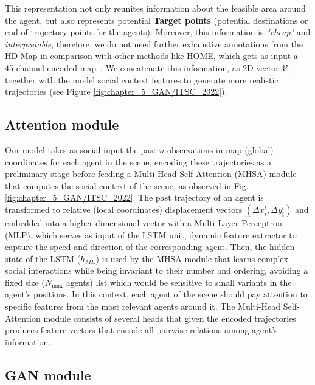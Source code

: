 This representation not only reunites information about the feasible area around the agent, but also represents potential \textbf{Target points} \cite{dendorfer2020goal} (\ie potential destinations or end-of-trajectory points for the agents). Moreover, this information is \textit{"cheap"} and \textit{interpretable}, therefore, we do not need further exhaustive annotations from the HD Map in comparison with other methods like HOME, which gets as input a 45-channel encoded map~\cite{gilles2021home}.
%
We concatenate this information, as 2D vector $\mathcal{V}$, together with the model social context features to generate more realistic trajectories (see Figure \ref{fig:chapter_5_GAN/ITSC_2022}).

\subsection{Attention module}
\label{subsec:5_attention_module}

Our model takes as social input the past $n$ observations in map (global) coordinates for each agent in the scene, encoding these trajectories as a preliminary stage before feeding a Multi-Head Self-Attention (MHSA) \cite{vaswani2017attention} module that computes the social context of the scene, as observed in Fig. \ref{fig:chapter_5_GAN/ITSC_2022}. The past trajectory of an agent is transformed to relative (local coordinates) displacement vectors $\left( \Delta x_i^t, \Delta y_i^t \right)$ and embedded into a higher dimensional vector with a Multi-Layer Perceptron (MLP), which serves as input of the LSTM unit, dynamic feature extractor to capture the speed and direction of the corresponding agent. Then, the hidden state of the LSTM ($h_{M\!E}$) is used by the MHSA module that learns complex social interactions while being invariant to their number and ordering, avoiding a fixed size ($N_{\text{max}}$ agents) list which would be sensitive to small variants in the agent's positions. In this context, each agent of the scene should pay attention to specific features from the most relevant agents around it. The Multi-Head Self-Attention module consists of several heads that given the encoded trajectories produces feature vectors that encode all pairwise relations among agent's information. %

\subsection{GAN module}
\label{subsec:5_gan_module}

